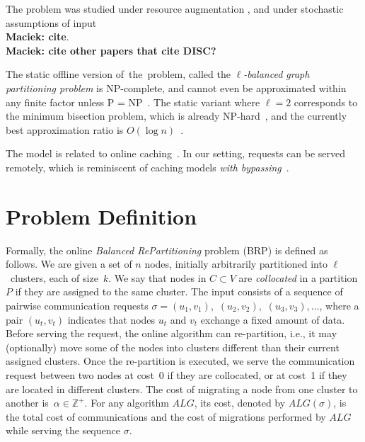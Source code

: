 \documentclass[manuscript,screen=true]{acmart}
\newcommand{\OBRP}{BRP}
\newcommand\maciek[1]{\color{brown}\textbf{\\ Maciek: #1}\color{black}}
\begin{document}
The problem was studied under resource augmentation \cite{repartition-disc}, and under stochastic assumptions of input\maciek{cite}.\maciek{cite other papers that cite DISC?}

The static offline version of~the~problem, called the
\emph{$\ell$-balanced graph partitioning problem} is 
NP-complete, and cannot even be approximated within any finite factor unless P
= NP~\cite{AndRae06}. The static
variant where $\ell = 2$ corresponds to the minimum bisection problem, which
is already NP-hard~\cite{GaJoSt76}, and 
the currently best approximation ratio is $O(\log n)$~\cite{SarVaz95,ArKaKa99,FeKrNi00,FeiKra02,KraFei06,Raec08}.

The model is related to online
caching~\cite{SleTar85,FKLMSY91,McGSle91,AcChNo00}. In our
setting, requests can be served remotely, which is
reminiscent of caching models \emph{with
bypassing}~\cite{EpImLN11,EpImLN15,Irani02}.


\section{Problem Definition}
\label{sec:problem-definition}

Formally, the online \emph{Balanced RePartitioning} problem (\OBRP{}) is defined as
follows. We are given a set of $n$ nodes,
initially arbitrarily partitioned into $\ell$~clusters,
each of size~$k$.
We say that nodes in $C \subset V$ are \emph{collocated} in a partition $P$
if they are assigned to the same cluster.
The input consists of a sequence of pairwise communication requests
$\sigma = (u_1,v_1),$ $(u_2,v_2),$ $(u_3,v_3), \ldots$,
where a pair $(u_t,v_t)$ indicates that nodes $u_t$ and $v_t$ exchange a fixed amount of data.
Before serving the request,
the online algorithm
can re-partition,
i.e.,
it may (optionally) move some of the nodes into clusters different than their current assigned clusters.
Once the re-partition is executed,
we serve
the communication request between two  nodes at cost~0 if they are collocated,
or at cost~1 if they are located in different clusters.
The cost of migrating a node from one cluster to another
is~$\alpha \in \mathbb{Z}^+$.
For any algorithm $ALG$,
its cost,
denoted by $ALG(\sigma)$,
is the total cost of communications and
the cost of migrations performed by $ALG$ while serving the sequence $\sigma$.
\end{document}
